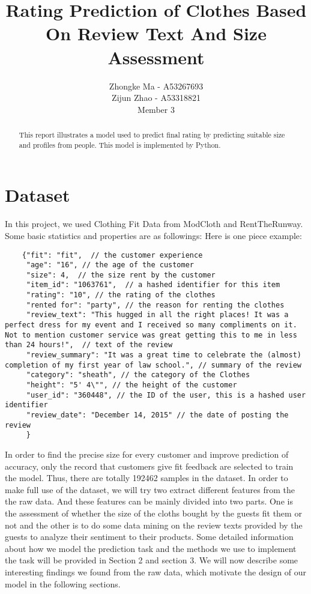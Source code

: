 \documentclass[letterpaper, 10 pt, conference]{ieeeconf}  %
\title{\LARGE \bf
Rating Prediction of Clothes Based On Review Text And Size Assessment
}
\author{Zhongke Ma - A53267693%
	\\Zijun Zhao - A53318821%
	\\Member 3
	
}
\begin{document}
\maketitle
\thispagestyle{empty}
\pagestyle{empty}


\begin{abstract}

This report illustrates a model used to predict final rating by predicting suitable size and profiles from people. This model is implemented by Python.

\end{abstract}


\section{Dataset}
	
	In this project, we used Clothing Fit Data from ModCloth and RentTheRunway. Some basic statistics and properties are as followings:
	Here is one piece example:

	\lstset{language=C}
	\begin{lstlisting}
	{"fit": "fit",  // the customer experience
	 "age": "16", // the age of the customer
	 "size": 4,  // the size rent by the customer
	 "item_id": "1063761",  // a hashed identifier for this item 
	 "rating": "10", // the rating of the clothes
	 "rented for": "party", // the reason for renting the clothes
	 "review_text": "This hugged in all the right places! It was a perfect dress for my event and I received so many compliments on it. Not to mention customer service was great getting this to me in less than 24 hours!",  // text of the review
	 "review_summary": "It was a great time to celebrate the (almost) completion of my first year of law school.", // summary of the review
	 "category": "sheath", // the category of the Clothes
	 "height": "5' 4\"", // the height of the customer
	 "user_id": "360448", // the ID of the user, this is a hashed user identifier 
	 "review_date": "December 14, 2015" // the date of posting the review
	 }
	\end{lstlisting}
	
	In order to find the precise size for every customer and improve prediction of accuracy, only the record that customers give fit feedback are selected to train the model. Thus, there are totally 192462 samples in the dataset. 
	In order to make full use of the dataset, we will try two extract different features from the the raw data. And these features can be mainly divided into two parts. One is the assessment of whether the size of the cloths bought by the guests fit them or not and the other is to do some data mining on the review texts provided by the guests to analyze their sentiment to their products. Some detailed information about how we model the prediction task and the methods we use to implement the task will be provided in Section 2 and section 3. We will now describe some interesting findings we found from the raw data, which motivate the design of our model in the following sections.
	
\end{document}
